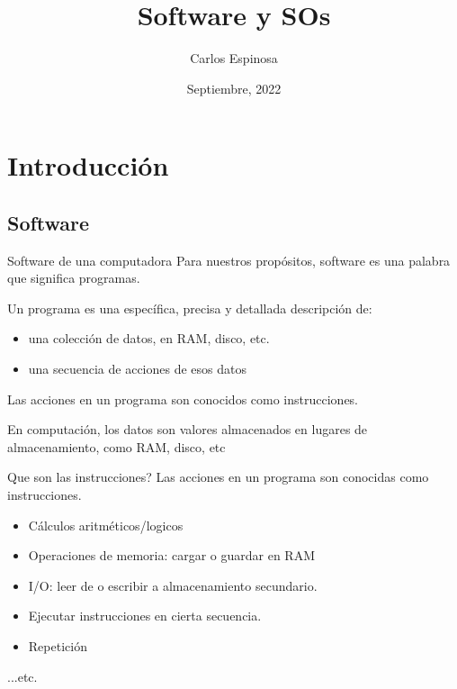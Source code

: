 \documentclass[11pt]{beamer}
\author{Carlos Espinosa}
\title{Software y SOs}
\institute{Facultad de Ciencias \\ Universidad Nacional Autónoma de México}
\date{Septiembre, 2022}
\begin{document}
\begin{frame}
\titlepage
\end{frame}

\section{Introducción}
	\subsection{Software}
		\begin{frame}{Software de una computadora}
			Para nuestros propósitos, software es una palabra que significa programas.
			
			Un programa es una específica, precisa y detallada descripción de:
			\begin{itemize}
				\item una colección de datos, en RAM, disco, etc.
				\item una secuencia de acciones de esos datos
			\end{itemize}
			
			Las acciones en un programa son conocidos como instrucciones.
			
			En computación, los datos son valores almacenados en lugares de almacenamiento, como RAM, disco, etc
		\end{frame}
		\begin{frame}{Que son las instrucciones?}
			Las acciones en un programa son conocidas como instrucciones.
			
			\begin{itemize}
				\item Cálculos aritméticos/logicos
				\item Operaciones de memoria: cargar o guardar en RAM
				\item I/O: leer de o escribir a almacenamiento secundario.
				\item Ejecutar instrucciones en cierta secuencia.
				\item Repetición
			\end{itemize}
			...etc.
		\end{frame}
\end{document}

